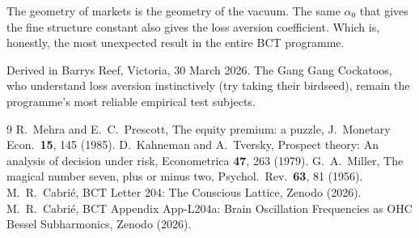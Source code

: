 \documentclass[aps,prl,twocolumn,superscriptaddress]{revtex4-2}
\begin{document}
The geometry of markets is the geometry of the vacuum. The same $\alpha_0$ that gives the fine structure constant also gives the loss aversion coefficient. Which is, honestly, the most unexpected result in the entire BCT programme.

\begin{acknowledgments}
Derived in Barrys Reef, Victoria, 30 March 2026. The Gang Gang Cockatoos, who understand loss aversion instinctively (try taking their birdseed), remain the programme's most reliable empirical test subjects.
\end{acknowledgments}

\begin{thebibliography}{9}
 R.~Mehra and E.~C.~Prescott, The equity premium: a puzzle, J.\ Monetary Econ.\ \textbf{15}, 145 (1985).
 D.~Kahneman and A.~Tversky, Prospect theory: An analysis of decision under risk, Econometrica \textbf{47}, 263 (1979).
 G.~A.~Miller, The magical number seven, plus or minus two, Psychol.\ Rev.\ \textbf{63}, 81 (1956).
 M.~R.~Cabri\'e, BCT Letter 204: The Conscious Lattice, Zenodo (2026).
 M.~R.~Cabri\'e, BCT Appendix App-L204a: Brain Oscillation Frequencies as OHC Bessel Subharmonics, Zenodo (2026).
\end{thebibliography}
\end{document}
